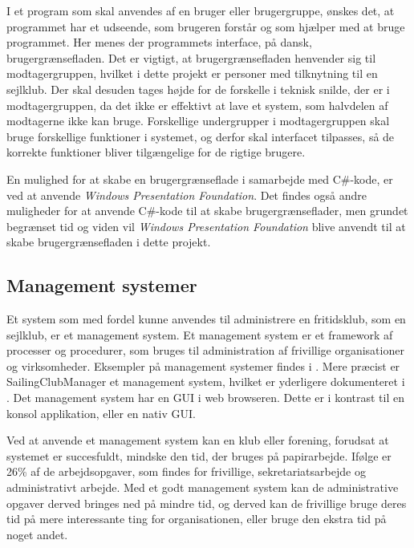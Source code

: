I et program som skal anvendes af en bruger eller brugergruppe, ønskes det, at programmet har et udseende, som
brugeren forstår og som hjælper med at bruge programmet. Her menes der programmets interface, på dansk,
brugergrænsefladen. Det er vigtigt, at brugergrænsefladen henvender sig til modtagergruppen, hvilket i dette
projekt er personer med tilknytning til en sejlklub. Der skal desuden tages højde for de forskelle i teknisk
snilde, der er i modtagergruppen, da det ikke er effektivt at lave et system, som halvdelen af modtagerne ikke
kan bruge. Forskellige undergrupper i modtagergruppen skal bruge forskellige funktioner i systemet, og derfor
skal interfacet tilpasses, så de korrekte funktioner bliver tilgængelige for de rigtige brugere.

En mulighed for at skabe en brugergrænseflade i samarbejde med C\#-kode, er ved at anvende \textit{Windows Presentation Foundation}. Det findes også andre muligheder for at anvende C\#-kode til at skabe brugergrænseflader, men grundet begrænset tid og viden vil
\textit{Windows Presentation Foundation} blive anvendt til at skabe brugergrænsefladen i dette projekt.

\subsection{Management systemer}\label{subsec:management-systemer}

Et system som med fordel kunne anvendes til administrere en fritidsklub, som en sejlklub, er et management system. Et management system er et
framework af processer og procedurer, som bruges til administration af frivillige organisationer og
virksomheder. Eksempler på management systemer findes i . Mere præcist er
SailingClubManager et management system, hvilket er yderligere dokumenteret i . Det
management system har en \ac{GUI} i web browseren. Dette er i kontrast til en konsol
applikation, eller en nativ \ac{GUI}.

Ved at anvende et management system kan en klub eller forening, forudsat at systemet er succesfuldt, mindske den
tid, der bruges på papirarbejde. Ifølge
\citet{Frivilligrapporten} er 26\% af de arbejdsopgaver, som findes for frivillige, sekretariatsarbejde og
administrativt arbejde. Med et godt management system kan de administrative opgaver derved bringes ned på
mindre tid, og derved kan de frivillige bruge deres tid på mere interessante ting for organisationen, eller
bruge den ekstra tid på noget andet.


